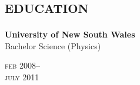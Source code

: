 

\section*{\textsc{education}}
\vspace{-0.2cm}

\begin{minipage}[t]{0.6\textwidth}
\textbf{University of New South Wales} \\
Bachelor Science (Physics)
\end{minipage}
\begin{minipage}[t]{0.4\textwidth}
{
\hfill \textsc{feb} 2008--\\ 
\hspace*{0pt} \hfill \textsc{july} 2011
\par
}
\end{minipage}
\vspace{-0.3cm}


